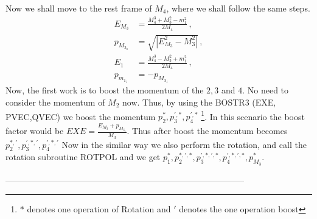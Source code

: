 \documentclass[12pt]{article}
\begin{document}
{{Now we shall move to the rest frame of $M_4$, where we shall follow the same steps.
\begin{align}
    E_{M_3} &= \frac{M_4^3 + M_3^2 - m_1^2 }{2M_4}\,,\\
    p_{M_{3_z}} &= \sqrt{| E_{M_3}^2 - M_3^2|} \,,\\
    E_1 &= \frac{M_4^3 - M_3^2 + m_1^2 }{2M_4}\,,\\
    p_{m_{1_z}} &= -p_{M_{3_z}}
\end{align}
Now, the first work is to boost the momentum of the $2,3$ and $4$. No need to consider the momentum of $M_2$ now. Thus, by using the BOSTR3 (EXE, PVEC,QVEC) we boost the momentum $p_{2}^*, p_{3}^{\prime,*}, p_4^{\prime,*}$ \footnote{$*$ denotes one operation of Rotation and $\prime$ denotes the one operation boost}.
In this scenario the boost factor would be  $EXE = \frac{E_{M_3} + p_{M_{3_z}}}{M_3}$. Thus after boost the momentum becomes $p_2^{*,\prime}, p_{3}^{\prime,*,\prime}, p_4^{\prime,*,\prime}$
 Now in the similar way we also perform the rotation, and call the rotation subroutine ROTPOL and we get  $p_1^*,p_2^{*,\prime,*}, p_{3}^{\prime,*,\prime,*}, p_4^{\prime,*,\prime,*}, p_{M_3}^*$.

------------------------------------------------------------------------------------

}}
\end{document}
